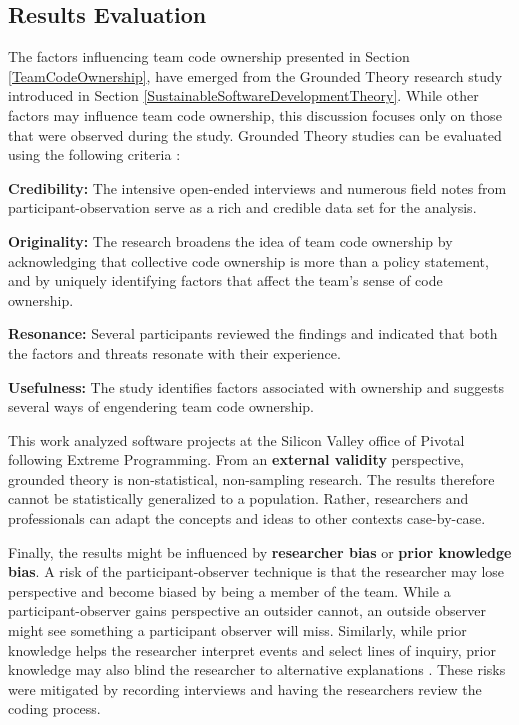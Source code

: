 \subsection{Results Evaluation}

The factors influencing team code ownership presented in Section \ref{TeamCodeOwnership}, have emerged from the Grounded Theory research study introduced in Section \ref{SustainableSoftwareDevelopmentTheory}. While other factors may influence team code ownership, this discussion focuses only on those that were observed during the study. Grounded Theory studies can be evaluated using the following criteria \cite{Charmaz}: 

\textbf{Credibility:}  The \numberOfInterviews{} intensive open-ended interviews and numerous field notes from participant-observation serve as a rich and credible data set for the analysis. 

\textbf{Originality:} The research broadens the idea of team code ownership by acknowledging that collective code ownership is more than a policy statement, and by uniquely identifying factors that affect the team's sense of code ownership.

\textbf{Resonance:} Several participants reviewed the findings and indicated that both the factors and threats resonate with their experience.

\textbf{Usefulness:} The study identifies factors associated with ownership and suggests several ways of engendering team code ownership.

This work analyzed software projects at the Silicon Valley office of Pivotal following Extreme Programming. From an \textbf{external validity} perspective, grounded theory is non-statistical, non-sampling research. The results therefore cannot be statistically generalized to a population. Rather, researchers and professionals can adapt the concepts and ideas to other contexts case-by-case. 

Finally, the results might be influenced by \textbf{researcher bias} or \textbf{prior knowledge bias}. A risk of the participant-observer technique is that the researcher may lose perspective and become biased by being a member of the team. While a participant-observer gains perspective an outsider cannot, an outside observer might see something a participant observer will miss. Similarly, while prior knowledge helps the researcher interpret events and select lines of inquiry, prior knowledge may also blind the researcher to alternative explanations \cite{GlaserIssues}. These risks were mitigated by recording interviews and having the researchers review the coding process. 

